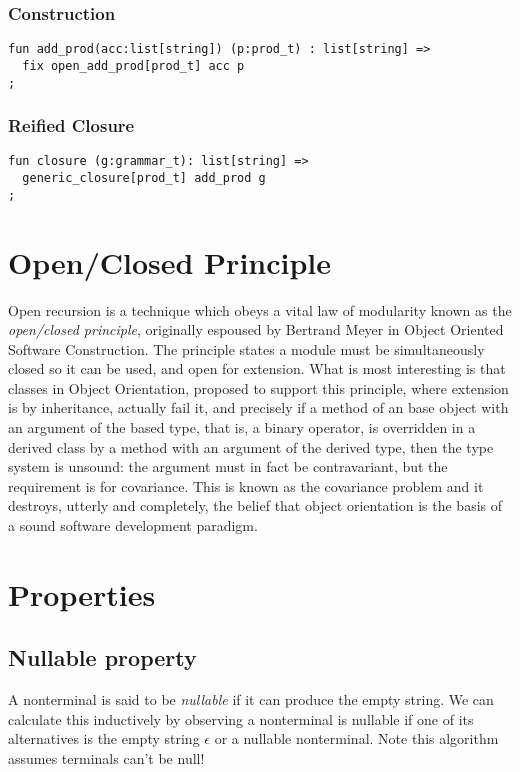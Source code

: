 \documentclass[oneside]{book}
\begin{document}
\subsubsection{Construction}
\begin{verbatim}
fun add_prod(acc:list[string]) (p:prod_t) : list[string] =>
  fix open_add_prod[prod_t] acc p
;
\end{verbatim}

\subsubsection{Reified Closure}
\begin{verbatim}
fun closure (g:grammar_t): list[string] =>
  generic_closure[prod_t] add_prod g
;
\end{verbatim}

\section{Open/Closed Principle}
Open recursion is a technique which obeys a vital law of
modularity known as the {\em open/closed principle}, originally
espoused by Bertrand Meyer in Object Oriented Software Construction.
The principle states a module must be simultaneously closed so it
can be used, and open for extension. What is most interesting
is that classes in Object Orientation, proposed to support
this principle, where extension is by inheritance, actually
fail it, and precisely if a method of an base object with
an argument of the based type, that is, a binary operator,
is overridden in a derived class by a method with an argument
of the derived type, then the type system is unsound: the argument
must in fact be contravariant, but the requirement is for covariance.
This is known as the covariance problem and it destroys, utterly
and completely, the belief that object orientation is the basis
of a sound software development paradigm.

\section{Properties}
\subsection{Nullable property}
A nonterminal is said to be {\em nullable} if it can produce
the empty string. We can calculate this inductively by observing
a nonterminal is nullable if one of its alternatives is the empty
string $\epsilon$ or a nullable nonterminal. Note this algorithm
assumes terminals can't be null!
\end{document}
